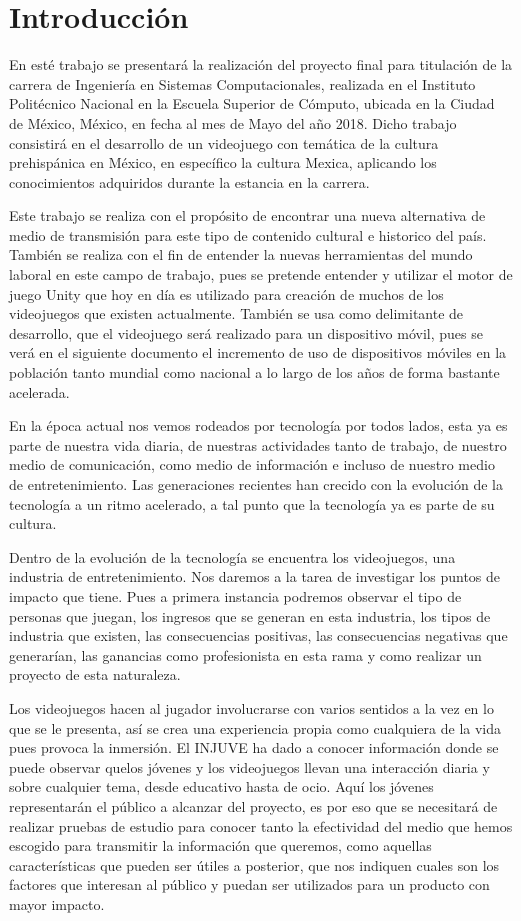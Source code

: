\chapter{Introducción}

En esté trabajo se presentará la realización del proyecto final para titulación de la carrera de Ingeniería en Sistemas Computacionales, realizada en el Instituto Politécnico Nacional en la Escuela Superior de Cómputo, ubicada en la Ciudad de México, México, en fecha al mes de Mayo del año 2018. Dicho trabajo consistirá en el desarrollo de un videojuego con temática de la cultura prehispánica en México, en específico la cultura Mexica, aplicando los conocimientos adquiridos durante la estancia en la carrera. 

Este trabajo se realiza con el propósito de encontrar una nueva alternativa de medio de transmisión para este tipo de contenido cultural e historico del país. También se realiza con el fin de entender la nuevas herramientas del mundo laboral en este campo de trabajo, pues se pretende entender y utilizar el motor de juego Unity que hoy en día es utilizado para creación de muchos de los videojuegos que existen actualmente. También se usa como delimitante de desarrollo, que el videojuego será realizado para un dispositivo móvil, pues se verá en el siguiente documento el incremento de uso de dispositivos móviles en la población tanto mundial como nacional a lo largo de los años de forma bastante acelerada.	 

En la época actual nos vemos rodeados por tecnología por todos lados, esta ya es parte de nuestra vida diaria, de nuestras actividades tanto de trabajo, de nuestro medio de comunicación, como medio de información e incluso de nuestro medio de entretenimiento. Las generaciones recientes han crecido con la evolución de la tecnología a un ritmo acelerado, a tal punto que la tecnología ya es parte de su cultura.

Dentro de la evolución de la tecnología se encuentra los videojuegos, una industria de entretenimiento.  
Nos daremos a la tarea de investigar los puntos de impacto que tiene. Pues a primera instancia podremos observar el tipo de personas que juegan, los ingresos que se generan en esta industria, los tipos de industria que existen, las consecuencias positivas, las consecuencias negativas que generarían, las ganancias como profesionista en esta rama y como realizar un proyecto de esta naturaleza.

Los videojuegos hacen al jugador involucrarse con varios sentidos a la vez en lo que se le presenta, así se crea una experiencia propia como cualquiera de la vida pues provoca la inmersión. El INJUVE ha dado a conocer información donde se puede observar quelos jóvenes y los videojuegos llevan una interacción diaria y sobre cualquier tema, desde educativo hasta de ocio. Aquí los jóvenes representarán el público a alcanzar del proyecto, es por eso que se necesitará de realizar pruebas de estudio para conocer tanto la efectividad del medio que hemos escogido para transmitir la información que queremos, como aquellas características que pueden ser útiles a posterior, que nos indiquen cuales son los factores que interesan al público y puedan ser utilizados para un producto con mayor impacto.

